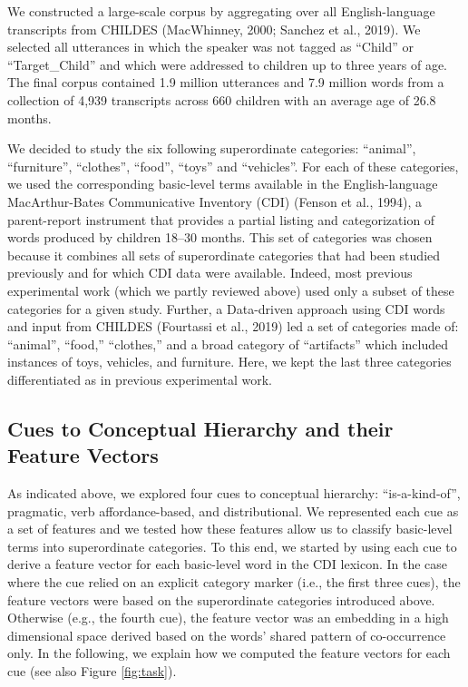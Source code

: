 \documentclass[english,,man,floatsintext]{apa6}
\begin{document}
We constructed a large-scale corpus by aggregating over all English-language transcripts from CHILDES (MacWhinney, 2000; Sanchez et al., 2019). We selected all utterances in which the speaker was not tagged as \enquote{Child} or \enquote{Target\_Child} and which were addressed to children up to three years of age. The final corpus contained 1.9 million utterances and 7.9 million words from a collection of 4,939 transcripts across 660 children with an average age of 26.8 months.

We decided to study the six following superordinate categories: \enquote{animal}, \enquote{furniture}, \enquote{clothes}, \enquote{food}, \enquote{toys} and \enquote{vehicles}. For each of these categories, we used the corresponding basic-level terms available in the English-language MacArthur-Bates Communicative Inventory (CDI) (Fenson et al., 1994), a parent-report instrument that provides a partial listing and categorization of words produced by children 18--30 months. This set of categories was chosen because it combines all sets of
superordinate categories that had been studied previously and for which CDI data were available. Indeed, most previous experimental work (which we partly reviewed above) used only a subset of these categories for a given study. Further, a Data-driven approach using CDI words and input from CHILDES (Fourtassi et al., 2019) led a set of categories made of: \enquote{animal}, \enquote{food,} \enquote{clothes,} and a broad category of \enquote{artifacts} which included instances of toys, vehicles, and furniture. Here, we kept the last three categories differentiated as in previous experimental work.

\hypertarget{cues-to-conceptual-hierarchy-and-their-feature-vectors}{%
\subsection{Cues to Conceptual Hierarchy and their Feature Vectors}\label{cues-to-conceptual-hierarchy-and-their-feature-vectors}}

As indicated above, we explored four cues to conceptual hierarchy: \enquote{is-a-kind-of}, pragmatic, verb affordance-based, and distributional.
We represented each cue as a set of features and we tested how these features allow us to classify basic-level terms into superordinate
categories. To this end, we started by using each cue to derive a feature vector for each basic-level word in the CDI lexicon. In the case where the cue relied on an explicit category marker (i.e., the first three cues), the feature vectors were based on the superordinate categories introduced above. Otherwise (e.g., the fourth cue), the feature vector was an embedding in a high dimensional space derived based on the words' shared pattern of co-occurrence only. In the following, we explain how we computed the feature vectors for each cue (see also Figure \ref{fig:task}).
\end{document}
